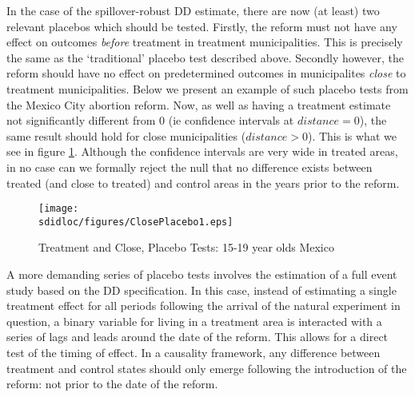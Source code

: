 In the case of the spillover-robust DD estimate, there are now (at least) two
relevant placebos which should be tested.  Firstly, the reform must not have any
effect on outcomes \emph{before} treatment in treatment municipalities.  This is
precisely the same as the `traditional' placebo test described above.  Secondly
however, the reform should have no effect on predetermined outcomes in 
municipalites \emph{close} to treatment municipalities.  Below we present an 
example of such placebo tests from the Mexico City abortion reform.  Now, as well
as having a treatment estimate not significantly different from 0 (ie confidence 
intervals at $distance=0$), the same result should hold for close municipalities 
($distance>0$).  This is what we see in figure \ref{SFig:MexClose}.  Although 
the confidence intervals are very wide in treated areas, in no case can we
formally reject the null that no difference exists between treated (and close
to treated) and control areas in the years prior to the reform.
\begin{figure}[h!]
\texttt{[image: \\sdidloc/figures/ClosePlacebo1.eps]}
\caption{Treatment and Close, Placebo Tests: 15-19 year olds Mexico}
\label{SFig:MexClose}
\vspace{2mm}
\end{figure}

A more demanding series of placebo tests involves the estimation of a full event
study based on the DD specification. In this case, instead of estimating a single
treatment effect for all periods following the arrival of the natural experiment
in question, a binary variable for living in a treatment area is interacted with 
a series of lags and leads around the date of the reform.  This allows for a 
direct test of the timing of effect. In a \citet{Granger1969} causality 
framework, any difference between treatment and control states should only emerge 
following the introduction of the reform: not prior to the date of the reform.  

